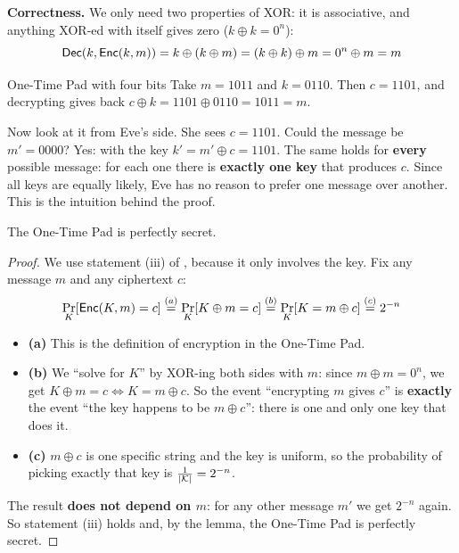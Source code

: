 \textbf{Correctness.} We only need two properties of XOR: it is associative, and anything XOR-ed with itself gives zero ($k \oplus k = 0^n$):
\[
  \mathsf{Dec}(k, \mathsf{Enc}(k, m)) = k \oplus (k \oplus m) = (k \oplus k) \oplus m = 0^n \oplus m = m
\]

\begin{framedex}{One-Time Pad with four bits}
  Take $m = 1011$ and $k = 0110$. Then $c = 1101$, and decrypting gives back $c \oplus k = 1101 \oplus 0110 = 1011 = m$.

  Now look at it from Eve's side. She sees $c = 1101$. Could the message be $m' = 0000$? Yes: with the key $k' = m' \oplus c = 1101$. The same holds for \textbf{every} possible message: for each one there is \textbf{exactly one key} that produces $c$. Since all keys are equally likely, Eve has no reason to prefer one message over another. This is the intuition behind the proof.
\end{framedex}

\begin{framedprop}[label={prop:otp}]{}
  The One-Time Pad is perfectly secret.
\end{framedprop}

\begin{proof}
  We use statement (iii) of , because it only involves the key. Fix any message $m$ and any ciphertext $c$:
  \[
    \Pr_K[\mathsf{Enc}(K, m) = c] \overset{(a)}{=} \Pr_K[K \oplus m = c] \overset{(b)}{=} \Pr_K[K = m \oplus c] \overset{(c)}{=} 2^{-n}
  \]
  \begin{itemize}
    \item \textbf{(a)} This is the definition of encryption in the One-Time Pad.
    \item \textbf{(b)} We ``solve for $K$'' by XOR-ing both sides with $m$: since $m \oplus m = 0^n$, we get $K \oplus m = c \iff K = m \oplus c$. So the event ``encrypting $m$ gives $c$'' is \textbf{exactly} the event ``the key happens to be $m \oplus c$'': there is one and only one key that does it.
    \item \textbf{(c)} $m \oplus c$ is one specific string and the key is uniform, so the probability of picking exactly that key is $\frac{1}{|\mathcal{K}|} = 2^{-n}$.
  \end{itemize}
  The result \textbf{does not depend on $m$}: for any other message $m'$ we get $2^{-n}$ again. So statement (iii) holds and, by the lemma, the One-Time Pad is perfectly secret.
\end{proof}

